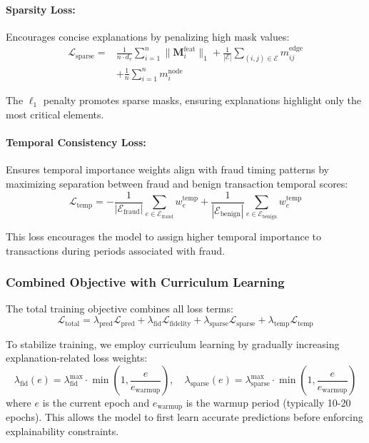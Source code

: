 \paragraph{Sparsity Loss:} Encourages concise explanations by penalizing high mask values:
\begin{align}
    \mathcal{L}_{\text{sparse}} = &\frac{1}{n \cdot d_v} \sum_{i=1}^{n} \|\mathbf{M}^{\text{feat}}_i\|_1 + \frac{1}{|\mathcal{E}|} \sum_{(i,j) \in \mathcal{E}} m_{ij}^{\text{edge}} \nonumber \\
    &+ \frac{1}{n} \sum_{i=1}^{n} m_i^{\text{node}}
\end{align}

The $\ell_1$ penalty promotes sparse masks, ensuring explanations highlight only the most critical elements.

\paragraph{Temporal Consistency Loss:} Ensures temporal importance weights align with fraud timing patterns by maximizing separation between fraud and benign transaction temporal scores:
\begin{equation}
    \mathcal{L}_{\text{temp}} = -\frac{1}{|\mathcal{E}_{\text{fraud}}|} \sum_{e \in \mathcal{E}_{\text{fraud}}} w_e^{\text{temp}} + \frac{1}{|\mathcal{E}_{\text{benign}}|} \sum_{e \in \mathcal{E}_{\text{benign}}} w_e^{\text{temp}}
\end{equation}

This loss encourages the model to assign higher temporal importance to transactions during periods associated with fraud.

\subsubsection{Combined Objective with Curriculum Learning}

The total training objective combines all loss terms:
\begin{equation}
    \mathcal{L}_{\text{total}} = \lambda_{\text{pred}} \mathcal{L}_{\text{pred}} + \lambda_{\text{fid}} \mathcal{L}_{\text{fidelity}} + \lambda_{\text{sparse}} \mathcal{L}_{\text{sparse}} + \lambda_{\text{temp}} \mathcal{L}_{\text{temp}}
\end{equation}

To stabilize training, we employ curriculum learning by gradually increasing explanation-related loss weights:
\begin{equation}
    \lambda_{\text{fid}}(e) = \lambda_{\text{fid}}^{\max} \cdot \min\left(1, \frac{e}{e_{\text{warmup}}}\right), \quad \lambda_{\text{sparse}}(e) = \lambda_{\text{sparse}}^{\max} \cdot \min\left(1, \frac{e}{e_{\text{warmup}}}\right)
\end{equation}
where $e$ is the current epoch and $e_{\text{warmup}}$ is the warmup period (typically 10-20 epochs). This allows the model to first learn accurate predictions before enforcing explainability constraints.

